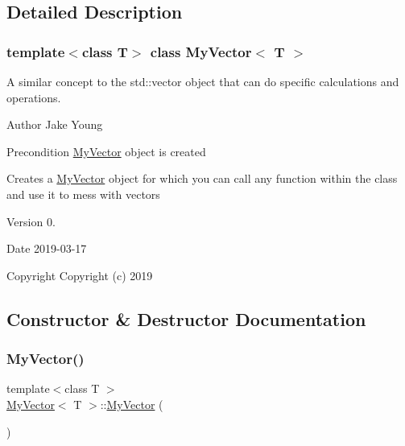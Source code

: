 \subsection{Detailed Description}
\subsubsection*{template$<$class T$>$\newline
class My\+Vector$<$ T $>$}

A similar concept to the std\+::vector object that can do specific calculations and operations. 

\begin{DoxyAuthor}{Author}
Jake Young 
\end{DoxyAuthor}
\begin{DoxyPrecond}{Precondition}
\mbox{\hyperlink{class_my_vector}{My\+Vector}} object is created 

Creates a \mbox{\hyperlink{class_my_vector}{My\+Vector}} object for which you can call any function within the class and use it to mess with vectors 
\end{DoxyPrecond}
\begin{DoxyVersion}{Version}
0. 
\end{DoxyVersion}
\begin{DoxyDate}{Date}
2019-\/03-\/17
\end{DoxyDate}
\begin{DoxyCopyright}{Copyright}
Copyright (c) 2019 
\end{DoxyCopyright}


\subsection{Constructor \& Destructor Documentation}
\mbox{\label{class_my_vector_ac356762c5ced52c0d934476cef32e472}} 
\subsubsection{\texorpdfstring{MyVector()}{MyVector()}\hspace{0.1cm}{\footnotesize\ttfamily [1/4]}}
{\footnotesize\ttfamily template$<$class T $>$ \\
\mbox{\hyperlink{class_my_vector}{My\+Vector}}$<$ T $>$\+::\mbox{\hyperlink{class_my_vector}{My\+Vector}} (\begin{DoxyParamCaption}{ }\end{DoxyParamCaption})}



